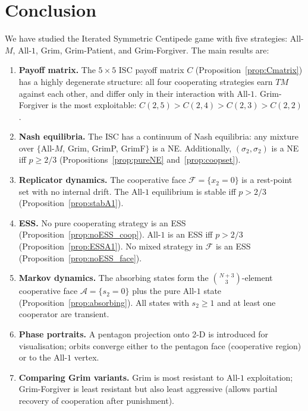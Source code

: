 \documentclass[12pt,a4paper]{article}
\begin{document}
\section{Conclusion}
\label{sec:conc}

We have studied the Iterated Symmetric Centipede game with five strategies:
All-$M$, All-$1$, Grim, Grim-Patient, and Grim-Forgiver.  The main results are:

\begin{enumerate}
  \item \textbf{Payoff matrix.}  The $5\times5$ ISC payoff matrix $C$
        (Proposition~\ref{prop:Cmatrix}) has a highly degenerate structure:
        all four cooperating strategies earn $TM$ against each other,
        and differ only in their interaction with All-$1$.  Grim-Forgiver is
        the most exploitable: $C(2,5)>C(2,4)>C(2,3)>C(2,2)$.

  \item \textbf{Nash equilibria.}  The ISC has a continuum of Nash equilibria:
        any mixture over $\{$All-$M$, Grim, GrimP, GrimF$\}$ is a NE.
        Additionally, $(\sigma_2,\sigma_2)$ is a NE iff $p\geq 2/3$
        (Propositions~\ref{prop:pureNE} and~\ref{prop:coopset}).

  \item \textbf{Replicator dynamics.}  The cooperative face $\mathcal{F}=\{x_2=0\}$
        is a rest-point set with no internal drift.  The All-$1$ equilibrium
        is stable iff $p>2/3$ (Proposition~\ref{prop:stabA1}).

  \item \textbf{ESS.}  No pure cooperating strategy is an ESS
        (Proposition~\ref{prop:noESS_coop}).  All-$1$ is an ESS iff $p>2/3$
        (Proposition~\ref{prop:ESSA1}).  No mixed strategy in $\mathcal{F}$
        is an ESS (Proposition~\ref{prop:noESS_face}).

  \item \textbf{Markov dynamics.}  The absorbing states form the
        $\binom{N+3}{3}$-element cooperative face $\mathcal{A}=\{s_2=0\}$ plus
        the pure All-$1$ state (Proposition~\ref{prop:absorbing}).
        All states with $s_2\geq 1$ and at least one cooperator are transient.

  \item \textbf{Phase portraits.}  A pentagon projection onto 2-D is introduced
        for visualisation; orbits converge either to the pentagon face
        (cooperative region) or to the All-$1$ vertex.

  \item \textbf{Comparing Grim variants.}  Grim is most resistant to All-$1$
        exploitation; Grim-Forgiver is least resistant but also least
        aggressive (allows partial recovery of cooperation after punishment).
\end{enumerate}
\end{document}
